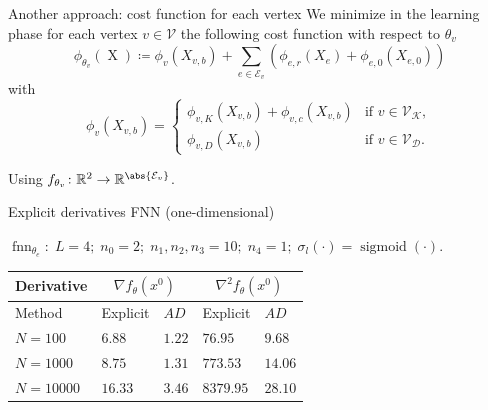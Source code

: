 \documentclass[9pt]{beamer}
\begin{document}
\begin{frame}{Another approach: cost function for each vertex}
    We minimize in the learning phase for each vertex $v \in \mathcal{V}$ the following cost function with respect to $\theta_v$
    \begin{equation*}
        \phi_{\theta_v} \left( \operatorname{X} \right) \coloneqq \phi_{v}(X_{v,b}) + \sum_{e \in \mathcal{E}_v} \left( \phi_{e,r}  \left( X_e \right) + \phi_{e,0}  \left( X_{e,0} \right) \right)
    \end{equation*}
    with 
    \begin{equation*}
        \phi_{v}(X_{v,b}) = \begin{cases} \phi_{v,K}  \left( X_{v,b} \right) +  \phi_{v,c}  \left( X_{v,b} \right)& \text{if } v \in \mathcal{V}_{\mathcal{K}}, \\ \phi_{v,D}  \left( X_{v,b} \right) & \text{if } v \in \mathcal{V}_{\mathcal{D}}. \end{cases}
    \end{equation*}
    \vspace{5mm}

    Using $f_{\theta_v} \colon \mathbb{R}^2 \to \mathbb{R}^{\abs{\mathcal{E}_v}}$.
\end{frame}



\begin{frame}{Explicit derivatives FNN (one-dimensional)}

    $\operatorname{fnn}_{\theta_e} \colon \; L = 4; \; n_0 = 2; \; n_1, n_2, n_3 = 10; \; n_4 = 1; \; \sigma_l\left( \cdot \right) = \operatorname{sigmoid} \left( \cdot \right)$. \\ 
    \vspace{5mm}
    \begin{table}[H]
        \resizebox{!}{!}
        {
            \begin{tabular}{l l l l l }
                \toprule
                Derivative & \multicolumn{2}{c}{$\nabla f_{\theta} \left( x^0 \right)$}& \multicolumn{2}{c}{$\nabla^2 f_{\theta} \left(x^0\right)$} \\ 
                \midrule
                Method & Explicit & $AD$ & Explicit & $AD$ \\ 
                \midrule
                $N = 100$ & $6.88$ & $1.22$ & $76.95$ & $9.68$ \\ 
                \midrule
                $N = 1000$ & $8.75$ & $1.31$ & $773.53$ & $14.06$ \\ 
                \midrule
                $N = 10000$ & $16.33$ & $3.46$ & $8379.95$ & $28.10$ \\ 
                \bottomrule
            \end{tabular}
        }
    \end{table}
\end{frame}
\end{document}
